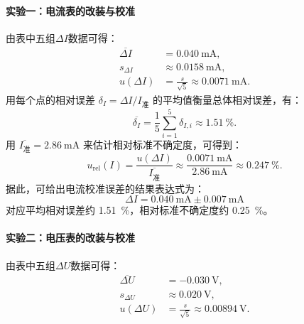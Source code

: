 \documentclass[]{../../templates/Report}%
\begin{document}
\begin{fullreportonly}
    \paragraph{实验一：电流表的改装与校准}
    由表中五组$\Delta I$数据可得：
    \begin{align}
        \overline{\Delta I} & = \SI{0.040}{\milli\ampere},                             \\
        s_{\Delta I}        & \approx \SI{0.0158}{\milli\ampere},                      \\
        u(\Delta I)         & = \frac{s}{\sqrt{5}} \approx \SI{0.0071}{\milli\ampere}.
    \end{align}
    用每个点的相对误差 $\delta_I=\Delta I/I_\text{准}$ 的平均值衡量总体相对误差，有：
    \begin{equation}
        \overline{\delta_I} = \frac{1}{5}\sum_{i=1}^5 \delta_{I,i} \approx \SI{1.51}{\percent}.
    \end{equation}
    用 $\overline{I_\text{准}}=\SI{2.86}{\milli\ampere}$ 来估计相对标准不确定度，可得到：
    \begin{equation}
        u_\text{rel}(I) = \frac{u(\Delta I)}{\overline{I_\text{准}}} \approx \frac{\SI{0.0071}{\milli\ampere}}{\SI{2.86}{\milli\ampere}} \approx \SI{0.247}{\percent}.
    \end{equation}
    据此，可给出电流校准误差的结果表达式为：
    \begin{equation}
        \boxed{\Delta I = \SI{0.040}{\milli\ampere} \pm \SI{0.007}{\milli\ampere}}
    \end{equation}
    对应平均相对误差约 \SI{1.51}{\percent}，相对标准不确定度约 \SI{0.25}{\percent}。

    \paragraph{实验二：电压表的改装与校准}
    由表中五组$\Delta U$数据可得：
    \begin{align}
        \overline{\Delta U} & = \SI{-0.030}{\volt},                             \\
        s_{\Delta U}        & \approx \SI{0.020}{\volt},                        \\
        u(\Delta U)         & = \frac{s}{\sqrt{5}} \approx \SI{0.00894}{\volt}.
    \end{align}


\end{fullreportonly}
\end{document}
